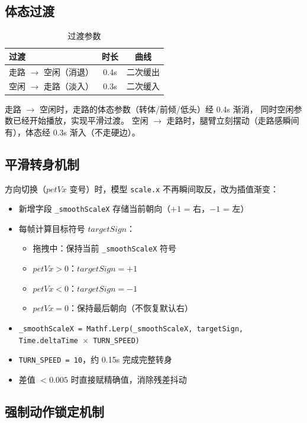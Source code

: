 \documentclass[12pt,a4paper]{ctexart}
\begin{document}
\subsection{体态过渡}

\begin{table}[H]
\centering
\caption{过渡参数}
\label{tab:blend}
\begin{tabular}{lcc}
\toprule
\textbf{过渡} & \textbf{时长} & \textbf{曲线} \\
\midrule
走路 $\to$ 空闲（消退） & 0.4s & 二次缓出 \\
空闲 $\to$ 走路（淡入） & 0.3s & 二次缓入 \\
\bottomrule
\end{tabular}
\end{table}

走路 $\to$ 空闲时，走路的体态参数（转体/前倾/低头）经 0.4s 渐消，
同时空闲参数已经开始播放，实现平滑过渡。
空闲 $\to$ 走路时，腿臂立刻摆动（走路感瞬间有），体态经 0.3s 渐入（不走硬边）。

\subsection{平滑转身机制}

方向切换（$petVx$ 变号）时，模型 \texttt{scale.x} 不再瞬间取反，改为插值渐变：

\begin{itemize}
    \item 新增字段 \texttt{\_smoothScaleX} 存储当前朝向（$+1$ = 右，$-1$ = 左）
    \item 每帧计算目标符号 $targetSign$：
    \begin{itemize}
        \item 拖拽中：保持当前 \texttt{\_smoothScaleX} 符号
        \item $petVx > 0$：$targetSign = +1$
        \item $petVx < 0$：$targetSign = -1$
        \item $petVx = 0$：保持最后朝向（不恢复默认右）
    \end{itemize}
    \item \texttt{\_smoothScaleX = Mathf.Lerp(\_smoothScaleX, targetSign, Time.deltaTime $\times$ TURN\_SPEED)}
    \item \texttt{TURN\_SPEED = 10}，约 0.15s 完成完整转身
    \item 差值 $< 0.005$ 时直接赋精确值，消除残差抖动
\end{itemize}

\subsection{强制动作锁定机制}
\end{document}
